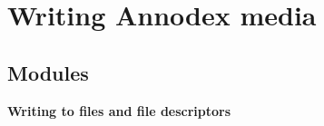 \section{Writing Annodex media}
\label{group__writing}


\subsection*{Modules}
\begin{CompactItemize}
\item 
{\bf Writing to files and file descriptors}
\end{CompactItemize}
